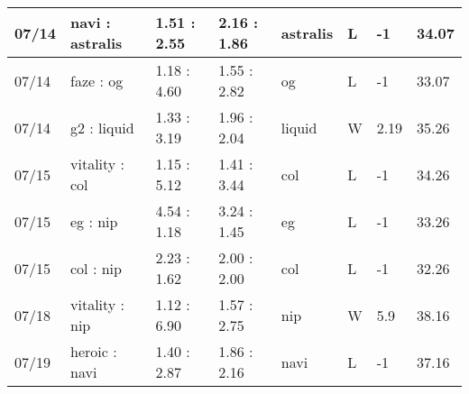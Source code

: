 \begin{small}
\begin{longtable}{|l|l|l|l|l|l|l|l|}
	07/14                               & navi : astralis                     & 1.51 : 2.55                             & 2.16 : 1.86                             & astralis                          & L                                 & -1                                   & 34.07                             \\ \hline
	07/14                               & faze : og                           & 1.18 : 4.60                             & 1.55 : 2.82                             & og                                & L                                 & -1                                   & 33.07                             \\ \hline
	07/14                               & g2 : liquid                         & 1.33 : 3.19                             & 1.96 : 2.04                             & liquid                            & W                                 & 2.19                                 & 35.26                             \\ \hline
	07/15                               & vitality : col                      & 1.15 : 5.12                             & 1.41 : 3.44                             & col                               & L                                 & -1                                   & 34.26                             \\ \hline
	07/15                               & eg : nip                            & 4.54 : 1.18                             & 3.24 : 1.45                             & eg                                & L                                 & -1                                   & 33.26                             \\ \hline
	07/15                               & col : nip                           & 2.23 : 1.62                             & 2.00 : 2.00                             & col                               & L                                 & -1                                   & 32.26                             \\ \hline
	07/18                               & vitality : nip                      & 1.12 : 6.90                             & 1.57 : 2.75                             & nip                               & W                                 & 5.9                                  & 38.16                             \\ \hline
	07/19                               & heroic : navi                       & 1.40 : 2.87                             & 1.86 : 2.16                             & navi                              & L                                 & -1                                   & 37.16                             \\ \hline

\end{longtable}
\end{small}
